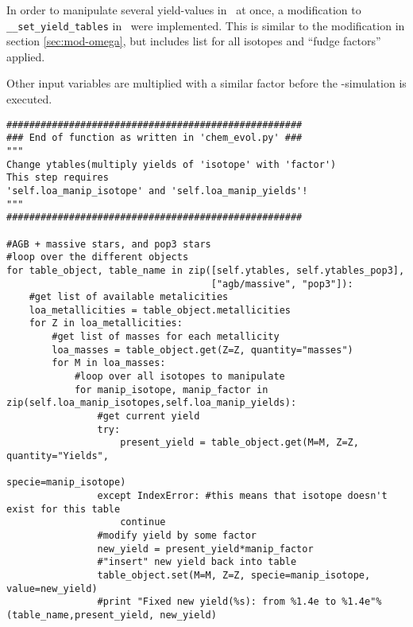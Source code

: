 \label{sec:mod-omega2}

In order to manipulate several yield-values in \omegamodel\ at once, a modification to \verb|__set_yield_tables| in \chemevol\ were implemented.
This is similar to the modification in section \ref{sec:mod-omega}, but includes list for all isotopes and ``fudge factors'' applied.

Other input variables are multiplied with a similar factor before the \omegamodel-simulation is executed.

\begin{lstlisting}[style=custompython, caption={Some caption}]
####################################################
### End of function as written in 'chem_evol.py' ###
""" 
Change ytables(multiply yields of 'isotope' with 'factor')
This step requires 
'self.loa_manip_isotope' and 'self.loa_manip_yields'!
"""
####################################################

#AGB + massive stars, and pop3 stars
#loop over the different objects
for table_object, table_name in zip([self.ytables, self.ytables_pop3],
                                    ["agb/massive", "pop3"]):
    #get list of available metalicities
    loa_metallicities = table_object.metallicities
    for Z in loa_metallicities:
        #get list of masses for each metallicity
        loa_masses = table_object.get(Z=Z, quantity="masses")
        for M in loa_masses:
            #loop over all isotopes to manipulate
            for manip_isotope, manip_factor in zip(self.loa_manip_isotopes,self.loa_manip_yields):
                #get current yield 
                try:
                    present_yield = table_object.get(M=M, Z=Z, quantity="Yields",
                                                     specie=manip_isotope)
                except IndexError: #this means that isotope doesn't exist for this table
                    continue
                #modify yield by some factor
                new_yield = present_yield*manip_factor 
                #"insert" new yield back into table
                table_object.set(M=M, Z=Z, specie=manip_isotope, value=new_yield)
                #print "Fixed new yield(%s): from %1.4e to %1.4e"%(table_name,present_yield, new_yield)


\end{lstlisting}

